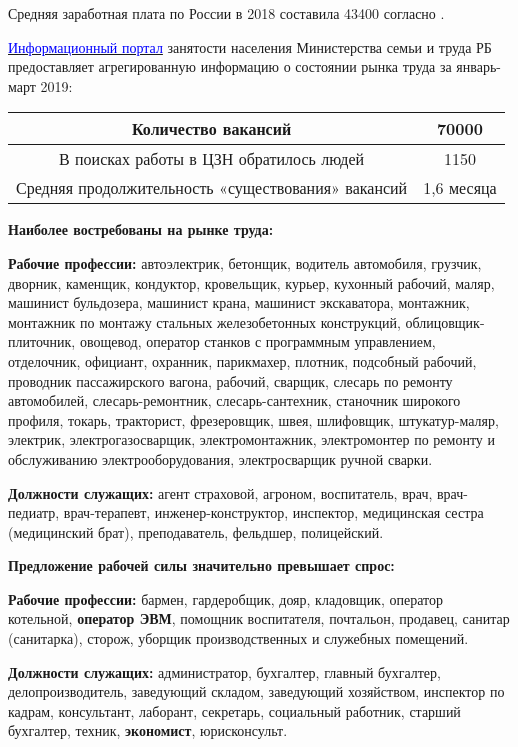 Средняя заработная плата по России в 2018 составила 43400 согласно .

\href{http://www.bashzan.ru/posts/120111}{\textcolor{blue}{Информационный портал}} занятости населения 
Министерства семьи и труда РБ предоставляет агрегированную информацию о состоянии рынка труда за январь-март 2019:

\smallskip

\begin{tabular}{|c|c|}
\hline
Количество вакансий & 70000 \\
\hline
В поисках работы в ЦЗН обратилось людей & 1150 \\
\hline
Средняя продолжительность «существования» вакансий & 1,6 месяца \\
\hline
\end{tabular}

\bigskip

\textbf{Наиболее востребованы на рынке труда:}

\textbf{Рабочие профессии:} автоэлектрик, бетонщик, водитель автомобиля, грузчик, дворник, каменщик, кондуктор, кровельщик, курьер, кухонный рабочий, маляр, машинист бульдозера, машинист крана, машинист экскаватора, монтажник, монтажник по монтажу стальных железобетонных конструкций, облицовщик-плиточник, овощевод, оператор станков с программным управлением, отделочник, официант, охранник, парикмахер, плотник, подсобный рабочий, проводник пассажирского вагона, рабочий, сварщик, слесарь по ремонту автомобилей, слесарь-ремонтник, слесарь-сантехник, станочник широкого профиля, токарь, тракторист, фрезеровщик, швея, шлифовщик, штукатур-маляр, электрик, электрогазосварщик, электромонтажник, электромонтер по ремонту и обслуживанию электрооборудования, электросварщик ручной сварки.

\textbf{Должности служащих:} агент страховой, агроном, воспитатель, врач, врач-педиатр, врач-терапевт, инженер-конструктор, инспектор, медицинская сестра (медицинский брат), преподаватель, фельдшер, полицейский.

\bigskip

\textbf{Предложение рабочей силы значительно превышает спрос:}

\textbf{Рабочие профессии:} бармен, гардеробщик, дояр, кладовщик, оператор котельной, \textbf{оператор ЭВМ}, помощник воспитателя, почтальон, продавец, санитар (санитарка), сторож, уборщик производственных и служебных помещений.

\textbf{Должности служащих:} администратор, бухгалтер, главный бухгалтер, делопроизводитель, заведующий складом, заведующий хозяйством, инспектор по кадрам, консультант, лаборант, секретарь, социальный работник, старший бухгалтер, техник, \textbf{экономист}, юрисконсульт.

